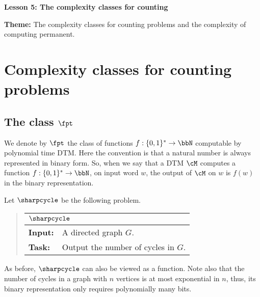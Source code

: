\documentclass[11pt, a4paper]{article}
\renewcommand{\lesson}{5}
\renewcommand{\lessontitle}{The complexity classes for counting}
\renewcommand{\fulltitle}{Lesson \lesson: \lessontitle}
\begin{document}
\date{}



\begin{center}
{\Large {\bf \fulltitle}}
\end{center}
\vspace{0.5cm}

\noindent
{\bf Theme:} The complexity classes for counting problems and the complexity of computing permanent.



\section{Complexity classes for counting problems}
\label{sec:counting-class}


\subsection{The class $\fpt$}
\label{subsec:fpt}

We denote by $\fpt$ the class of functions $f:\{0,1\}^*\to \bbN$
computable by polynomial time DTM.
Here the convention is that a natural number is always represented in binary form.
So, when we say that a DTM $\cM$ computes a function $f:\{0,1\}^*\to\bbN$,
on input word $w$, the output of $\cM$ on $w$ is $f(w)$ in the binary representation.

Let $\sharpcycle$ be the following problem.
\begin{quote}
{\def\arraystretch{1.25}
\begin{tabular}{|ll|}
\hline
\multicolumn{2}{|l|}{$\sharpcycle$}
\\
\hline
{\bf Input:}
&
A directed graph $G$.
\\
{\bf Task:}
&
Output the number of cycles in $G$.
\\
\hline
\end{tabular}}
\end{quote}
As before, $\sharpcycle$ can also be viewed as a function.
Note also that the number of cycles in a graph with $n$ vertices is at most exponential in $n$,
thus, its binary representation only requires polynomially many bits.
 
\end{document}
